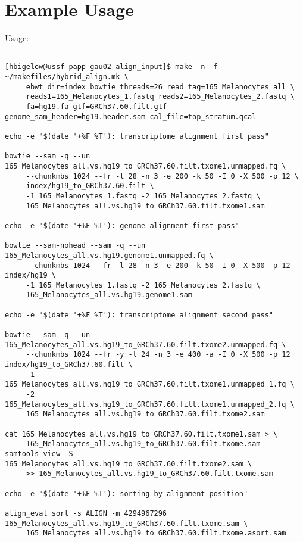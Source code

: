 \documentclass[10pt]{article}
\begin{document}
\section*{Example Usage}

Usage:

{\small
\begin{verbatim}

[hbigelow@ussf-papp-gau02 align_input]$ make -n -f ~/makefiles/hybrid_align.mk \
     ebwt_dir=index bowtie_threads=26 read_tag=165_Melanocytes_all \
     reads1=165_Melanocytes_1.fastq reads2=165_Melanocytes_2.fastq \
     fa=hg19.fa gtf=GRCh37.60.filt.gtf genome_sam_header=hg19.header.sam cal_file=top_stratum.qcal

echo -e "$(date '+%F %T'): transcriptome alignment first pass"

bowtie --sam -q --un 165_Melanocytes_all.vs.hg19_to_GRCh37.60.filt.txome1.unmapped.fq \
     --chunkmbs 1024 --fr -l 28 -n 3 -e 200 -k 50 -I 0 -X 500 -p 12 \
	 index/hg19_to_GRCh37.60.filt \
     -1 165_Melanocytes_1.fastq -2 165_Melanocytes_2.fastq \
     165_Melanocytes_all.vs.hg19_to_GRCh37.60.filt.txome1.sam

echo -e "$(date '+%F %T'): genome alignment first pass"

bowtie --sam-nohead --sam -q --un 165_Melanocytes_all.vs.hg19.genome1.unmapped.fq \
     --chunkmbs 1024 --fr -l 28 -n 3 -e 200 -k 50 -I 0 -X 500 -p 12 index/hg19 \
     -1 165_Melanocytes_1.fastq -2 165_Melanocytes_2.fastq \
     165_Melanocytes_all.vs.hg19.genome1.sam

echo -e "$(date '+%F %T'): transcriptome alignment second pass"

bowtie --sam -q --un 165_Melanocytes_all.vs.hg19_to_GRCh37.60.filt.txome2.unmapped.fq \
     --chunkmbs 1024 --fr -y -l 24 -n 3 -e 400 -a -I 0 -X 500 -p 12 index/hg19_to_GRCh37.60.filt \
     -1 165_Melanocytes_all.vs.hg19_to_GRCh37.60.filt.txome1.unmapped_1.fq \
     -2 165_Melanocytes_all.vs.hg19_to_GRCh37.60.filt.txome1.unmapped_2.fq \
     165_Melanocytes_all.vs.hg19_to_GRCh37.60.filt.txome2.sam

cat 165_Melanocytes_all.vs.hg19_to_GRCh37.60.filt.txome1.sam > \
     165_Melanocytes_all.vs.hg19_to_GRCh37.60.filt.txome.sam
samtools view -S 165_Melanocytes_all.vs.hg19_to_GRCh37.60.filt.txome2.sam \
     >> 165_Melanocytes_all.vs.hg19_to_GRCh37.60.filt.txome.sam

echo -e "$(date '+%F %T'): sorting by alignment position"

align_eval sort -s ALIGN -m 4294967296 165_Melanocytes_all.vs.hg19_to_GRCh37.60.filt.txome.sam \
     165_Melanocytes_all.vs.hg19_to_GRCh37.60.filt.txome.asort.sam


\end{verbatim}}
\end{document}
